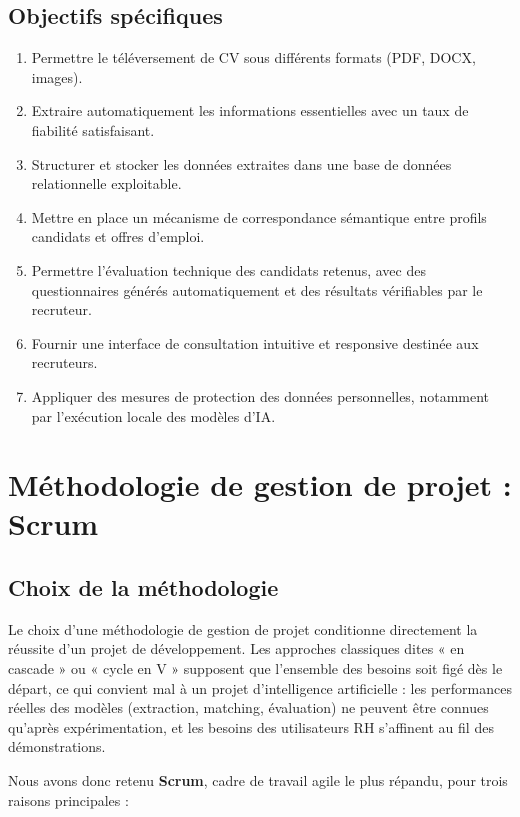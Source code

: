 \documentclass[12pt,a4paper]{report}
\begin{document}
\subsection*{Objectifs spécifiques}

\begin{enumerate}
  \item Permettre le téléversement de CV sous différents formats (PDF, DOCX, images).
  \item Extraire automatiquement les informations essentielles avec un taux de fiabilité satisfaisant.
  \item Structurer et stocker les données extraites dans une base de données relationnelle exploitable.
  \item Mettre en place un mécanisme de correspondance sémantique entre profils candidats et offres d'emploi.
  \item Permettre l'évaluation technique des candidats retenus, avec des questionnaires générés automatiquement et des résultats vérifiables par le recruteur.
  \item Fournir une interface de consultation intuitive et responsive destinée aux recruteurs.
  \item Appliquer des mesures de protection des données personnelles, notamment par l'exécution locale des modèles d'IA.
\end{enumerate}

\section{Méthodologie de gestion de projet : Scrum}

\subsection{Choix de la méthodologie}

Le choix d'une méthodologie de gestion de projet conditionne directement la réussite d'un projet de développement. Les approches classiques dites « en cascade » ou « cycle en V » supposent que l'ensemble des besoins soit figé dès le départ, ce qui convient mal à un projet d'intelligence artificielle : les performances réelles des modèles (extraction, matching, évaluation) ne peuvent être connues qu'après expérimentation, et les besoins des utilisateurs RH s'affinent au fil des démonstrations.

Nous avons donc retenu \textbf{Scrum}, cadre de travail agile le plus répandu, pour trois raisons principales :
\end{document}
